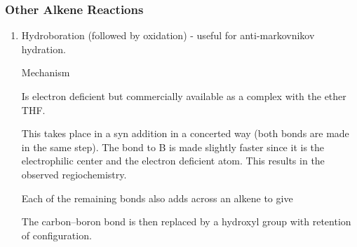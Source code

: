 \subsubsection{Other Alkene Reactions}

\begin{enumerate}[label=\alph*)]

  \item Hydroboration (followed by oxidation) - useful for anti-markovnikov
    hydration.


    Mechanism


    Is electron deficient but commercially available as a complex with the ether
    THF.


    This takes place in a syn addition in a concerted way (both bonds are made
    in the same step). The bond to B is made slightly faster since it is the
    electrophilic center and the electron deficient atom. This results in the
    observed regiochemistry.

    Each of the remaining  bonds also adds across an alkene to give


    The carbon--boron bond is then replaced by a hydroxyl group with retention
    of configuration.


\end{enumerate}